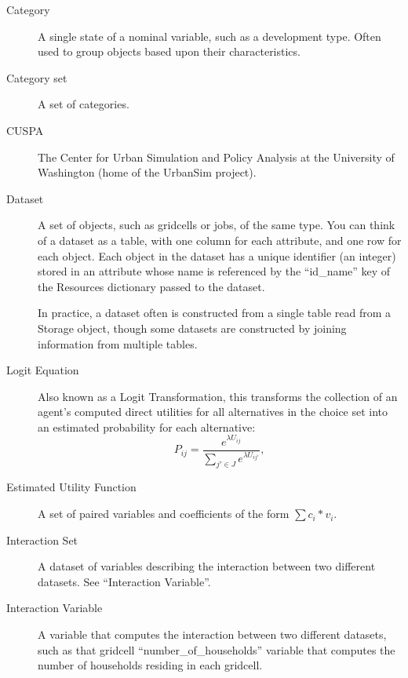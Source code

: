 \begin{description}
\item[Category] 
A single state of a nominal variable, such as a development type.
Often used to group objects based upon their characteristics. \characteristicsindex

\item[Category set] 
A set of categories.

\item[CUSPA] \cuspaindex
The Center for Urban Simulation and Policy Analysis \cuspaindex at the University of Washington
(home of the UrbanSim project).

\item[Dataset] \datasetindex
A set of objects, such as gridcells or jobs, of the same type.
You can think of a dataset \datasetindex as a table, with one column
for each attribute, \attributesindex and one row for each object.  
Each object in the dataset \datasetindex has a unique identifier (an integer) stored in
an attribute \attributesindex whose name is referenced by the ``id_name'' key
of the Resources dictionary passed to the dataset. \datasetindex  

In practice, a dataset \datasetindex often is constructed from a single
table read from a Storage object, though some datasets \datasetindex
are constructed by joining information from multiple tables.

\item[Logit Equation] 
Also known as a Logit Transformation, this transforms the
collection of an agent's computed direct utilities for all
alternatives in the choice set into an estimated probability for
each alternative:
\begin{equation}
    P_{ij}=\frac{e^{\lambda U_{ij}}}{\sum_{j' \in J}e^{\lambda
    U_{ij'}}},
\end{equation}

\item[Estimated Utility Function] 
A set of paired variables \variablesindex and coefficients \coefficientsindex of the form $\sum
c_{i}*v_{i}$.

\item[Interaction Set] 
A dataset \datasetindex of variables \variablesindex describing the interaction between two
different datasets. \datasetindex  See ``Interaction Variable''. \variablesindex

\item[Interaction Variable] 
A variable \variablesindex that computes the interaction between two different
datasets, \datasetindex such as that gridcell ``number_of_households'' 
variable \variablesindex that computes the number of households residing in
each gridcell.


\end{description}
